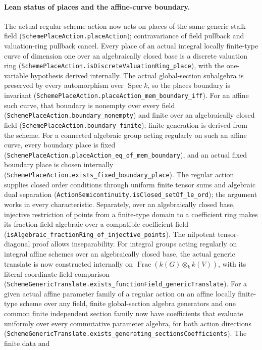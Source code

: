 \documentclass[11pt,oneside]{article}
\theoremstyle{definition}
\theoremstyle{remark}
\newcommand{\lean}[1]{\nolinkurl{#1}}
\begin{document}
\paragraph{Lean status of places and the affine-curve boundary.}
The actual regular scheme action now acts on places of the same generic-stalk field
(\lean{SchemePlaceAction.placeAction}); contravariance of field pullback and valuation-ring
pullback cancel. Every place of an actual integral locally finite-type curve of dimension
one over an algebraically closed base is a discrete valuation ring
(\lean{SchemePlaceAction.isDiscreteValuationRing_place}), with the one-variable hypothesis
derived internally. The actual global-section subalgebra is preserved by every
automorphism over $\operatorname{Spec} k$, so the places boundary is invariant
(\lean{SchemePlaceAction.placeAction_mem_boundary_iff}). For an affine such curve, that
boundary is nonempty over every field (\lean{SchemePlaceAction.boundary_nonempty}) and
finite over an algebraically closed field (\lean{SchemePlaceAction.boundary_finite});
finite generation is derived from the scheme. For a connected algebraic group acting
regularly on such an affine curve, every boundary place is fixed
(\lean{SchemePlaceAction.placeAction_eq_of_mem_boundary}), and an actual fixed boundary
place is chosen internally (\lean{SchemePlaceAction.exists_fixed_boundary_place}). The
regular action supplies closed order conditions through uniform finite tensor sums and
algebraic dual separation (\lean{ActionSemicontinuity.isClosed_setOf_le_ord}); the argument
works in every characteristic. Separately, over an algebraically closed base, injective
restriction of points from a finite-type domain to a coefficient ring makes its fraction
field algebraic over a compatible coefficient field
(\lean{isAlgebraic_fractionRing_of_injective_points}). The nilpotent tensor-diagonal proof
allows inseparability. For integral groups acting regularly on integral affine schemes over
an algebraically closed base, the actual generic translate is now constructed internally
on $\operatorname{Frac}(k(G)\otimes_k k(V))$, with its literal coordinate-field comparison
(\lean{SchemeGenericTranslate.exists_functionField_genericTranslate}). For a given actual
affine parameter family of a regular action on an affine locally finite-type scheme over any
field, finite global-section algebra generators and one common finite independent section
family now have coefficients that evaluate uniformly over every commutative parameter
algebra, for both action directions
(\lean{SchemeGenericTranslate.exists_generating_sectionsCoefficients}). The finite data and
\end{document}

